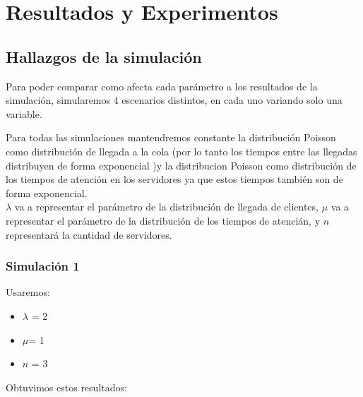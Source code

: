 \documentclass[11pt]{article}
\begin{document}
    \section{Resultados y Experimentos}

    \subsection{Hallazgos de la simulación}

    Para poder comparar como afecta cada parámetro a los resultados de la simulación, simularemos 4 escenarios distintos,
    en cada uno variando solo una variable. 
    
    Para todas las simulaciones mantendremos constante la distribución Poisson como distribución de llegada a la cola (por lo tanto los tiempos entre las llegadas
    distribuyen de forma exponencial )y la distribucion Poisson como distribución de los tiempos de atención en los servidores ya que estos tiempos también son de forma exponencial.\\
    $\lambda$ va a representar el parámetro de la distribución de llegada de clientes, $\mu$ va a representar el parámetro
    de la distribución de los tiempos de atencián, y $n$ representará la cantidad de servidores.

    
    \subsubsection{Simulación 1}

    Usaremos:
    \begin{itemize}
        \item $\lambda$ = 2
        \item $\mu $= 1
        \item $n$ = 3
    \end{itemize}

    Obtuvimos estos resultados: \\
\end{document}
